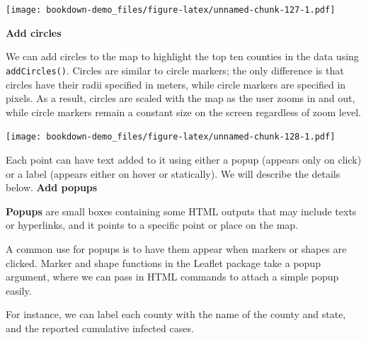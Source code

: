 \documentclass[]{book}
\newenvironment{Shaded}{\begin{snugshade}}{\end{snugshade}}
\newcommand{\KeywordTok}[1]{\textcolor[rgb]{0.13,0.29,0.53}{\textbf{#1}}}
\newcommand{\DataTypeTok}[1]{\textcolor[rgb]{0.13,0.29,0.53}{#1}}
\newcommand{\DecValTok}[1]{\textcolor[rgb]{0.00,0.00,0.81}{#1}}
\newcommand{\StringTok}[1]{\textcolor[rgb]{0.31,0.60,0.02}{#1}}
\newcommand{\OperatorTok}[1]{\textcolor[rgb]{0.81,0.36,0.00}{\textbf{#1}}}
\newcommand{\NormalTok}[1]{#1}
\begin{document}
\texttt{[image: bookdown-demo\_files/figure-latex/unnamed-chunk-127-1.pdf]}

\textbf{Add circles}

We can add circles to the map to highlight the top ten counties in the
data using \texttt{addCircles()}. Circles are similar to circle markers;
the only difference is that circles have their radii specified in
meters, while circle markers are specified in pixels. As a result,
circles are scaled with the map as the user zooms in and out, while
circle markers remain a constant size on the screen regardless of zoom
level.

\begin{Shaded}
\end{Shaded}

\texttt{[image: bookdown-demo\_files/figure-latex/unnamed-chunk-128-1.pdf]}

Each point can have text added to it using either a popup (appears only
on click) or a label (appears either on hover or statically). We will
describe the details below. \textbf{Add popups}

\textbf{Popups} are small boxes containing some HTML outputs that may
include texts or hyperlinks, and it points to a specific point or place
on the map.

A common use for popups is to have them appear when markers or shapes
are clicked. Marker and shape functions in the Leaflet package take a
popup argument, where we can pass in HTML commands to attach a simple
popup easily.

For instance, we can label each county with the name of the county and
state, and the reported cumulative infected cases.

\begin{Shaded}
\end{Shaded}
\end{document}
